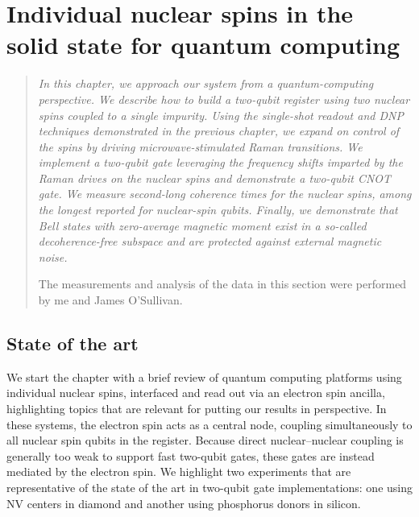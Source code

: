 
\setchapterpreamble[u]{\margintoc}
\chapter{Individual nuclear spins in the solid state for quantum computing}
\label{ch:individual_nuclear_spins_quantum_information}

\begin{quote}
\itshape
In this chapter, we approach our system from a quantum-computing perspective. We describe how to build a two-qubit register using two \W nuclear spins coupled to a single \Er impurity. Using the single-shot readout and DNP techniques demonstrated in the previous chapter, we expand on control of the spins by driving microwave-stimulated Raman transitions. We implement a two-qubit gate leveraging the frequency shifts imparted by the Raman drives on the nuclear spins and demonstrate a two-qubit CNOT gate. We measure second-long coherence times for the nuclear spins, among the longest reported for nuclear-spin qubits. Finally, we demonstrate that Bell states with zero-average magnetic moment exist in a so-called decoherence-free subspace and are protected against external magnetic noise.

The measurements and analysis of the data in this section were performed by me and James O'Sullivan.
\end{quote}

\section{State of the art}

We start the chapter with a brief review of quantum computing platforms using individual nuclear spins, interfaced and read out via an electron spin ancilla, highlighting topics that are relevant for putting our results in perspective. In these systems, the electron spin acts as a central node, coupling simultaneously to all nuclear spin qubits in the register. Because direct nuclear--nuclear coupling is generally too weak to support fast two-qubit gates, these gates are instead mediated by the electron spin. We highlight two experiments that are representative of the state of the art in two-qubit gate implementations: one using NV centers in diamond and another using phosphorus donors in silicon.


